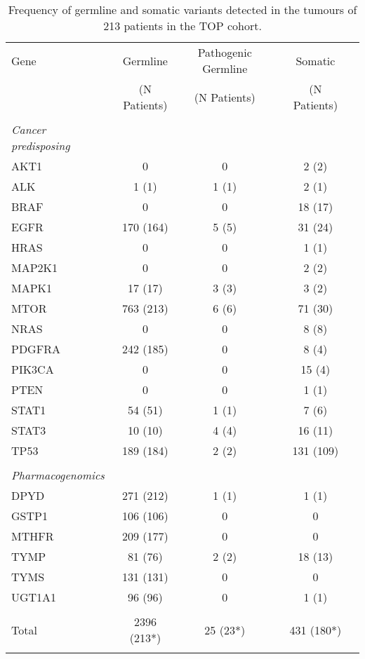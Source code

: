 \begin{table}[H]
\caption{Frequency of germline and somatic variants detected in the tumours of 213 patients in the TOP cohort.}\label{freqvariants}
\centering
\begin{tabular}{lcclcl}
        \hline
        Gene & Germline & Pathogenic Germline && Somatic \\
				 & (N Patients) & (N Patients) && (N Patients) \\
				\hline
				\\
				\multicolumn{1}{l}{\textit{Cancer predisposing}}
				&
				\multicolumn{2}{l}{ }
				&&
				\multicolumn{1}{l}{} \\
				\hline
				AKT1 & 0 & 0 && 2 (2) \\
				\arrayrulecolor{evagrey}\hline
				ALK & 1 (1) & 1 (1) && 2 (1) \\
				\hline
				BRAF & 0 & 0 && 18 (17) \\
				\hline
				EGFR & 170 (164) & 5 (5) && 31 (24) \\
				\hline
				HRAS & 0 & 0 && 1 (1) \\
				\hline
				MAP2K1 & 0 & 0 && 2 (2) \\
				\hline
				MAPK1 & 17 (17) & 3 (3) && 3 (2) \\
				\hline
				MTOR & 763 (213) & 6 (6) && 71 (30) \\
				\hline
				NRAS & 0 & 0 && 8 (8) \\
				\hline
				PDGFRA & 242 (185) & 0 && 8 (4) \\
				\hline
				PIK3CA & 0 & 0 && 15 (4) \\
				\hline
				PTEN & 0 & 0 && 1 (1) \\
				\hline
				STAT1 & 54 (51) & 1 (1) && 7 (6) \\
				\hline
				STAT3 & 10 (10) & 4 (4) && 16 (11) \\
				\hline
				TP53 & 189 (184) & 2 (2) && 131 (109) \\
				\arrayrulecolor{black}\hline
				\\
				\multicolumn{1}{l}{\textit{Pharmacogenomics}}
				&
				\multicolumn{2}{l}{ }
				&&
				\multicolumn{1}{l}{} \\
				\arrayrulecolor{black}\hline
				DPYD & 271 (212) & 1 (1) && 1 (1) \\
				\arrayrulecolor{evagrey}\hline
				GSTP1 & 106 (106) & 0 && 0 \\
				\hline
				MTHFR & 209 (177) & 0 && 0 \\
				\hline
				TYMP & 81 (76) & 2 (2) && 18 (13)\\
				\hline
				TYMS & 131 (131) & 0 && 0 \\
				\hline
				UGT1A1 & 96 (96) & 0 && 1 (1) \\
				\arrayrulecolor{black}\hline \\
				Total & 2396 (213*) & 25 (23*) && 431 (180*) \\
				\arrayrulecolor{black}\hline
      \end{tabular}
\end{table}
